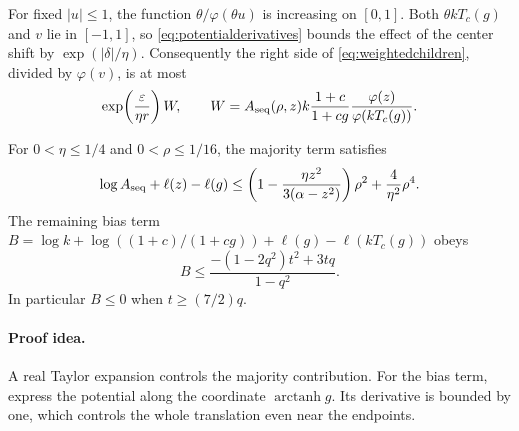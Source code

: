 For fixed \(|u|\le1\), the function
\(\theta/\varphi(\theta u)\) is increasing on \([0,1]\).
Both \(\theta kT_c(g)\) and \(v\) lie in \([-1,1]\), so
\eqref{eq:potentialderivatives} bounds the effect of the center
shift by \(\exp(|\delta|/\eta)\). Consequently the right side
of \eqref{eq:weightedchildren}, divided by \(\varphi(v)\), is at most
\begin{equation}\label{eq:potentialW}
\exp\!\left(\frac\varepsilon{\eta r}\right)W,
\qquad
W=A_{\rm seq}(\rho,z)k\frac{1+c}{1+cg}
\frac{\varphi(z)}{\varphi(kT_c(g))}.
\end{equation}

\begin{lemma}
\label{lem:potential-majority-bias}
For $0<\eta\le1/4$ and $0<\rho\le1/16$, the majority term
satisfies
\[
 \log A_{\rm seq}+\ell(z)-\ell(g)
 \le\left(1-\frac{\eta z^2}{3(\alpha-z^2)}\right)\rho^2
      +\frac4{\eta^2}\rho^4.
\]
The remaining bias term
$B=\log k+\log((1+c)/(1+cg))+\ell(g)-\ell(kT_c(g))$
obeys
\[
 B\le\frac{-(1-2q^2)t^2+3tq}{1-q^2}.
\]
In particular $B\le0$ when $t\ge(7/2)q$.
\end{lemma}

\paragraph{Proof idea.}
A real Taylor expansion controls the majority contribution. For the bias
term, express the potential along the coordinate $\operatorname{arctanh}g$.
Its derivative is bounded by one, which controls the whole translation even
near the endpoints.

